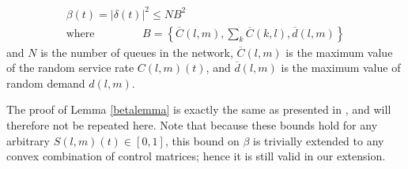 \begin{Lem} \label{betalemma}
\begin{gather}\label{betabound}
\beta(t)  = \big| \delta(t) \big|^2 \leq NB^2 \\
\text{where } \qquad \qquad B = \left\{ \overline{C}(l,m), \sum_{k} \overline{C}(k,l),  \overline{d}(l,m) \right\}
\end{gather}
and $N$ is the number of queues in the network, $\overline{C} (l,m)$ is the maximum value of the random service rate $C(l,m)(t)$, and $ \overline{d}(l,m)$ is the maximum value of random demand $d(l,m)$.
\end{Lem}
The proof of Lemma \ref{betalemma} is exactly the same as presented in \cite{MaxPressureStochastic}, and will therefore not be repeated here. Note that because these bounds hold for any arbitrary $S(l,m)(t) \in [0,1]$, this bound on $\beta$ is trivially extended to any convex combination of control matrices; hence it is still valid in our extension.

